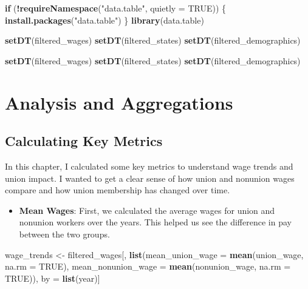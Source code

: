 \documentclass[
]{book}
\newenvironment{Shaded}{\begin{snugshade}}{\end{snugshade}}
\newcommand{\AttributeTok}[1]{\textcolor[rgb]{0.13,0.29,0.53}{#1}}
\newcommand{\ConstantTok}[1]{\textcolor[rgb]{0.56,0.35,0.01}{#1}}
\newcommand{\ControlFlowTok}[1]{\textcolor[rgb]{0.13,0.29,0.53}{\textbf{#1}}}
\newcommand{\FunctionTok}[1]{\textcolor[rgb]{0.13,0.29,0.53}{\textbf{#1}}}
\newcommand{\NormalTok}[1]{#1}
\newcommand{\OtherTok}[1]{\textcolor[rgb]{0.56,0.35,0.01}{#1}}
\newcommand{\SpecialCharTok}[1]{\textcolor[rgb]{0.81,0.36,0.00}{\textbf{#1}}}
\newcommand{\StringTok}[1]{\textcolor[rgb]{0.31,0.60,0.02}{#1}}
\providecommand{\tightlist}{%
  \setlength{\itemsep}{0pt}\setlength{\parskip}{0pt}}
\theoremstyle{definition}
\theoremstyle{definition}
\theoremstyle{definition}
\theoremstyle{definition}
\theoremstyle{remark}
\begin{document}
\begin{Shaded}
\begin{Highlighting}[]
\ControlFlowTok{if}\NormalTok{ (}\SpecialCharTok{!}\FunctionTok{requireNamespace}\NormalTok{(}\StringTok{"data.table"}\NormalTok{, }\AttributeTok{quietly =} \ConstantTok{TRUE}\NormalTok{)) \{}
  \FunctionTok{install.packages}\NormalTok{(}\StringTok{"data.table"}\NormalTok{)}
\NormalTok{\}}
\FunctionTok{library}\NormalTok{(data.table)}

\FunctionTok{setDT}\NormalTok{(filtered\_wages)}
\FunctionTok{setDT}\NormalTok{(filtered\_states)}
\FunctionTok{setDT}\NormalTok{(filtered\_demographics)}

\FunctionTok{setDT}\NormalTok{(filtered\_wages)}
\FunctionTok{setDT}\NormalTok{(filtered\_states)}
\FunctionTok{setDT}\NormalTok{(filtered\_demographics)}
\end{Highlighting}
\end{Shaded}

\section{Analysis and Aggregations}\label{analysis-and-aggregations}

\subsection{Calculating Key Metrics}\label{calculating-key-metrics}

In this chapter, I calculated some key metrics to understand wage trends and union impact. I wanted to get a clear sense of how union and nonunion wages compare and how union membership has changed over time.

\begin{itemize}
\tightlist
\item
  \textbf{Mean Wages}: First, we calculated the average wages for union and nonunion workers over the years. This helped us see the difference in pay between the two groups.
\end{itemize}

\begin{Shaded}
\begin{Highlighting}[]
\NormalTok{wage\_trends }\OtherTok{\textless{}{-}}\NormalTok{ filtered\_wages[, }
      \FunctionTok{list}\NormalTok{(}\AttributeTok{mean\_union\_wage =} \FunctionTok{mean}\NormalTok{(union\_wage, }
                                  \AttributeTok{na.rm =} \ConstantTok{TRUE}\NormalTok{),}
      \AttributeTok{mean\_nonunion\_wage =} \FunctionTok{mean}\NormalTok{(nonunion\_wage, }
                                \AttributeTok{na.rm =} \ConstantTok{TRUE}\NormalTok{)), by }\OtherTok{=} \FunctionTok{list}\NormalTok{(year)]}
\end{Highlighting}
\end{Shaded}
\end{document}
